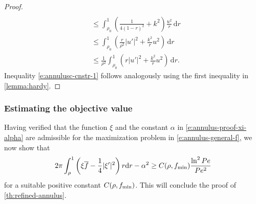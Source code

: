 \documentclass[a4paper, 10pt]{amsart}
\numberwithin{equation}{section}
\theoremstyle{plain}
\theoremstyle{definition}
\theoremstyle{remark}
\newcommand{\abs}[1]{\left\vert #1 \right\vert}
\newcommand{\dr}{\mathrm{d} r}
\begin{document}
\begin{proof}
\begin{align*}
        \\
        &\leq
       \int_{\rho_0}^1 
       \left(\frac{1}{4(1-r)^{2}}+k^{2}\right)\frac{u^{2}}{r}\,\dr
        \\
        &\leq
        \int_{\rho_0}^1
        \left(\frac{r}{\rho^{2}}\abs{u'}^{2}+\frac{k^{2}}{r}u^{2}\right)\,\dr
        \\
        &\leq
        \frac{1}{\rho^{2}}
        \int_{\rho_0}^1
        \left(r\abs{u'}^{2}+\frac{k^{2}}{r}u^{2}\right)\,\dr.
    \end{align*}
    Inequality \cref{e:annulusc-cnstr-1} follows analogously using the first inequality in \cref{lemma:hardy}.
\end{proof}


\subsubsection{Estimating the objective value}
\label{ss:annulus-proof-objective}

Having verified that the function $\xi$ and the constant $\alpha$ in \cref{e:annulus-proof-xi-alpha} are admissible for the maximization problem in \cref{e:annulus-general-f}, we now show that
\begin{equation}\label{e:annulus-proof-cost-bound}
    2\pi\int_{\rho}^1 \left( \xi \overline{f} - \frac14 |\xi'|^2 \right) r \dr - \alpha^2 \geq 
    C(\rho, f_{\rm min})
    \frac{\ln^{2}Pe}{Pe^{2}}
\end{equation}
for a suitable positive constant $C(\rho, f_{\rm min})$. This will conclude the proof of \cref{th:refined-annulus}.
\end{document}

